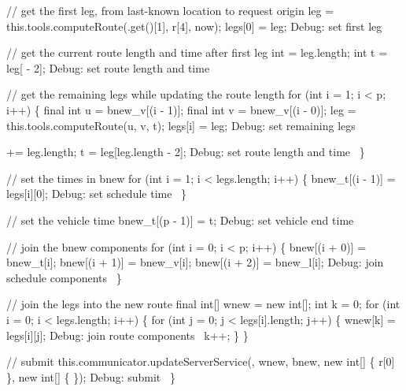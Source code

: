   // get the first leg, from last-known location to request origin
  leg = this.tools.computeRoute(.get()[1], r[4], now);
  legs[0] = leg;
  \LA{}Debug: set first leg~{\nwtagstyle{}}\RA{}

  // get the current route length and time after first leg
  int  = leg.length;
  int t = leg[ - 2];
  \LA{}Debug: set route length and time~{\nwtagstyle{}}\RA{}

  // get the remaining legs while updating the route length 
  for (int i = 1; i < p; i++) \{
    final int u = bnew_v[(i - 1)];
    final int v = bnew_v[(i - 0)];
    leg = this.tools.computeRoute(u, v, t);
    legs[i] = leg;
    \LA{}Debug: set remaining legs~{\nwtagstyle{}}\RA{}

     += leg.length;
    t = leg[leg.length - 2];
    \LA{}Debug: set route length and time~{\nwtagstyle{}}\RA{}
  \}

  // set the times in bnew
  for (int i = 1; i < legs.length; i++) \{
    bnew_t[(i - 1)] = legs[i][0];
    \LA{}Debug: set schedule time~{\nwtagstyle{}}\RA{}
  \}

  // set the vehicle  time
  bnew_t[(p - 1)] = t;
  \LA{}Debug: set vehicle end time~{\nwtagstyle{}}\RA{}

  // join the bnew components
  for (int i = 0; i < p; i++) \{
    bnew[(i + 0)] = bnew_t[i];
    bnew[(i + 1)] = bnew_v[i];
    bnew[(i + 2)] = bnew_l[i];
    \LA{}Debug: join schedule components~{\nwtagstyle{}}\RA{}
  \}

  // join the legs into the new route
  final int[] wnew = new int[];
  int k = 0;
  for (int i = 0; i < legs.length; i++) \{
    for (int j = 0; j < legs[i].length; j++) \{
      wnew[k] = legs[i][j];
      \LA{}Debug: join route components~{\nwtagstyle{}}\RA{}
      k++;
    \}
  \}

  // submit
  this.communicator.updateServerService(, wnew, bnew,
      new int[] \{ r[0] \}, new int[] \{ \});
  \LA{}Debug: submit~{\nwtagstyle{}}\RA{}
\}
\nwendcode{}\nwdocspar

